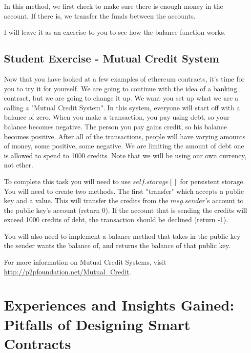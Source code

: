 \documentclass[10pt,twocolumn,letterpaper]{article}
\begin{document}
In this method, we first check to make sure there is enough money in the account. If there is, we transfer the funds between the accounts. 

I will leave it as an exercise to you to see how the balance function works.  

\subsection{Student Exercise - Mutual Credit System}
Now that you have looked at a few examples of ethereum contracts, it's time for you to try it for yourself. We are going to continue with the idea of a banking contract, but we are going to change it up. We want you set up what we are a calling a "Mutual Credit System". In this system, everyone will start off with a balance of zero. When you make a transaction, you pay using debt, so your balance becomes negative. The person you pay gains credit, so his balance becomes positive. After all of the transactions, people will have varying amounts of money, some positive, some negative. We are limiting the amount of debt one is allowed to spend to 1000 credits. Note that we will be using our own currency, not ether.

To complete this task you will need to use $self.storage[]$ for persistent storage. You will need to create two methods. The first "transfer" which accepts a public key and a value. This will transfer the credits from the $msg.sender$'s account to the public key's account (return 0). If the account that is sending the credits will exceed 1000 credits of debt, the transaction should be declined (return -1). 

You will also need to implement a balance method that takes in the public key the sender wants the balance of, and returns the balance of that public key.

For more information on Mutual Credit Systems, visit \url{http://p2pfoundation.net/Mutual_Credit}.


\section{Experiences and Insights Gained: Pitfalls of Designing Smart Contracts}
\end{document}
